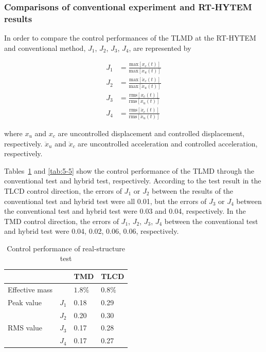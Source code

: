 \subsubsection{Comparisons of conventional experiment and RT-HYTEM results}

In order to compare the control performances of the TLMD at the RT-HYTEM and conventional method, $J_{1}$, $J_{2}$, $J_{3}$, $J_{4}$, are represented by

\begin{align}
J_{1}&=\frac{\text{max} \left[x_{c}(t) \right]}{\text{max} \left[x_{u}(t) \right]} \label{eq:5-14} \\
J_{2}&=\frac{\text{max} \left[\ddot{x}_{c}(t) \right]}{\text{max} \left[\ddot{x}_{u}(t) \right]} \label{eq:5-15} \\
J_{3}&=\frac{\text{rms} \left[x_{c}(t) \right]}{\text{rms} \left[x_{u}(t) \right]} \label{eq:5-16} \\
J_{4}&=\frac{\text{rms} \left[\ddot{x}_{c}(t) \right]}{\text{rms} \left[\ddot{x}_{u}(t) \right]} \label{eq:5-17}
\end{align}

where $x_{u}$ and $x_{c}$ are uncontrolled displacement and controlled displacement, respectively. $\ddot{x}_{u}$ and $\ddot{x}_{c}$ are uncontrolled acceleration and controlled acceleration, respectively.

Tables~\ref{tab:5-4} and \ref{tab:5-5} show the control performance of the TLMD through the conventional test and hybrid test, respectively. According to the test result in the TLCD control direction, the errors of $J_{1}$ or $J_{2}$ between the results of the conventional test and hybrid test were all 0.01, but the errors of $J_{3}$ or $J_{4}$ between the conventional test and hybrid test were 0.03 and 0.04, respectively. In the TMD control direction, the errors of $J_{1}$, $J_{2}$, $J_{3}$, $J_{4}$ between the conventional test and hybrid test were 0.04, 0.02, 0.06, 0.06, respectively.

\begin{table}[ht]
\centering
\begin{tabularx}{\textwidth}{@{}XXXX@{}}
\toprule[1pt]\midrule[0.3pt]
&& TMD & TLCD\\ \hline
Effective mass && $1.8\%$ & $0.8\%$\\
Peak value & $J_{1}$ & 0.18 & 0.29\\
& $J_{2}$ & 0.20 & 0.30\\
RMS value & $J_{3}$ & 0.17 & 0.28\\
& $J_{4}$ & 0.17 & 0.27\\
\bottomrule
\end{tabularx}
\caption{Control performance of real-structure test}
\label{tab:5-4}
\end{table}


